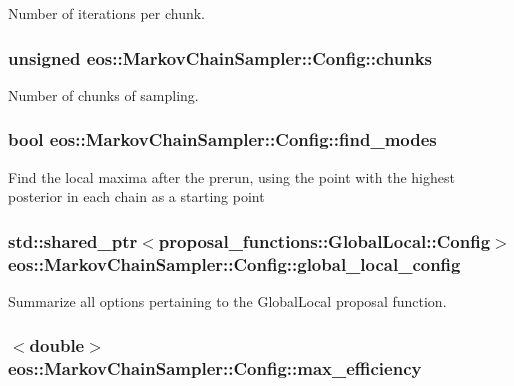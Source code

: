 Number of iterations per chunk. \hypertarget{classeos_1_1MarkovChainSampler_1_1Config_a5e5751b084b471b08aa6f33513c28047}{
\subsubsection[{chunks}]{\setlength{\rightskip}{0pt plus 5cm}unsigned {\bf eos::MarkovChainSampler::Config::chunks}}}
\label{classeos_1_1MarkovChainSampler_1_1Config_a5e5751b084b471b08aa6f33513c28047}


Number of chunks of sampling. \hypertarget{classeos_1_1MarkovChainSampler_1_1Config_a04afa9d1080b945fe1702b4d8d5fb2bb}{
\subsubsection[{find\_\-modes}]{\setlength{\rightskip}{0pt plus 5cm}bool {\bf eos::MarkovChainSampler::Config::find\_\-modes}}}
\label{classeos_1_1MarkovChainSampler_1_1Config_a04afa9d1080b945fe1702b4d8d5fb2bb}
Find the local maxima after the prerun, using the point with the highest posterior in each chain as a starting point \hypertarget{classeos_1_1MarkovChainSampler_1_1Config_ac717ab2f0caa32cc13b5e382f8b19cec}{
\subsubsection[{global\_\-local\_\-config}]{\setlength{\rightskip}{0pt plus 5cm}std::shared\_\-ptr$<${\bf proposal\_\-functions::GlobalLocal::Config}$>$ {\bf eos::MarkovChainSampler::Config::global\_\-local\_\-config}}}
\label{classeos_1_1MarkovChainSampler_1_1Config_ac717ab2f0caa32cc13b5e382f8b19cec}


Summarize all options pertaining to the GlobalLocal proposal function. \hypertarget{classeos_1_1MarkovChainSampler_1_1Config_a91c8438fe3b3270c619aefe5dc951e35}{
\subsubsection[{max\_\-efficiency}]{$<$double$>$ {\bf eos::MarkovChainSampler::Config::max\_\-efficiency}}}
\label{classeos_1_1MarkovChainSampler_1_1Config_a91c8438fe3b3270c619aefe5dc951e35}


